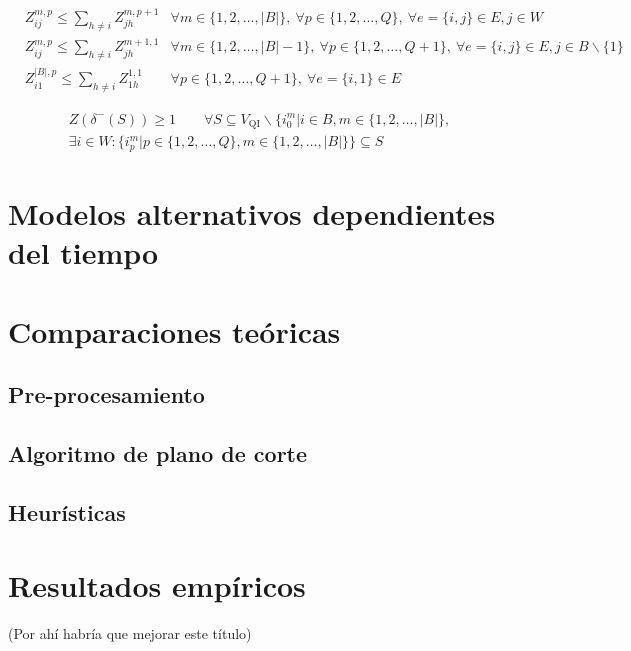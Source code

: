 \documentclass[10pt, a4paper]{article}
\theoremstyle{definition}
\begin{document}
\begin{align}
	& Z_{i j}^{m, p} \leq \sum_{h \neq i} Z_{j h}^{m, p+1} & \forall m \in\{1,2, \ldots,|B|\},\ \forall p \in\{1,2, \ldots, Q\},\ \forall e=\{i, j\} \in E, j \in W \label{eq:37} \\
	& Z_{i j}^{m, p} \leq \sum_{h \neq i} Z_{j h}^{m+1,1} & \forall m \in\{1,2, \ldots,|B|-1\},\ \forall p \in\{1,2, \ldots, Q+1\},\ \forall e=\{i, j\} \in E, j \in B \backslash\{1\} \label{eq:38} \\
	& Z_{i 1}^{|B|, p} \leq \sum_{h \neq i} Z_{1 h}^{1,1} & \forall p \in\{1,2, \ldots, Q+1\},\ \forall e=\{i, 1\} \in E \label{eq:39}
\end{align}

\begin{multline}
	 Z(\delta^{-}(S)) \geq 1 \quad \quad \forall S \subseteq V_{\mathrm{QI}} \backslash\{i_{0}^{m} | i \in B, m \in\{1,2, \ldots,|B|\}, \\
	 \exists i \in W : \{i_{p}^{m} | p \in \{1,2, \ldots, Q\}, m \in \{1,2, \ldots,|B|\}\} \subseteq S \label{eq:40}
\end{multline}

\section{Modelos alternativos dependientes del tiempo}

\section{Comparaciones teóricas}

\subsection{Pre-procesamiento}

\subsection{Algoritmo de plano de corte}

\subsection{Heurísticas}

\section{Resultados empíricos}

(Por ahí habría que mejorar este título)
\end{document}
